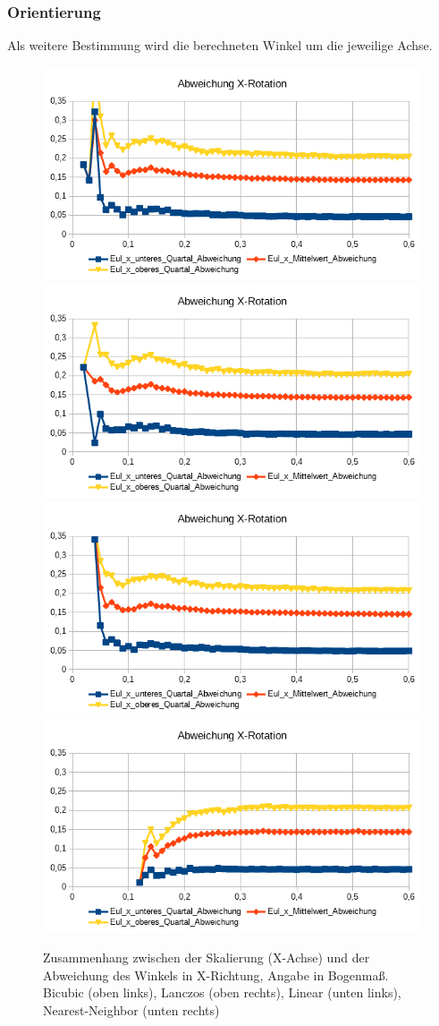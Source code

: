 \subsubsection{Orientierung}
Als weitere Bestimmung wird die berechneten Winkel um die jeweilige Achse.
\begin{figure}
	\centering
	\includegraphics[width=0.45\linewidth]{tabelle2/X_Rot_Cubic}
	\includegraphics[width=0.45\linewidth]{tabelle2/X_Rot_Lanc}
	\includegraphics[width=0.45\linewidth]{tabelle2/X_Rot_Linear}
	\includegraphics[width=0.45\linewidth]{tabelle2/X_Rot_NN}
	\caption{Zusammenhang zwischen der Skalierung (X-Achse) und der Abweichung des Winkels in X-Richtung, Angabe in Bogenmaß. 
		Bicubic (oben links), Lanczos (oben rechts), Linear (unten links), Nearest-Neighbor (unten rechts)}
	\label{img_X_Rot_Skal}
\end{figure}
